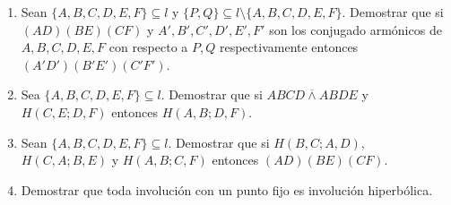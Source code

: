 \documentclass[12pt]{report}
\numberwithin{section}{chapter}
\begin{document}
\begin{enumerate}
\item Sean $\{A,B,C,D,E,F\}\subseteq l$ y $\{P,Q\}\subseteq l\setminus \{A,B,C,D,E,F\}$. Demostrar que si $(AD)(BE)(CF)$ y $A',B',C',D',E', F'$ son los conjugado armónicos de $A,B,C,D,E,F$ con respecto a $P, Q$  respectivamente entonces $(A'D')(B'E')(C'F')$.

\item Sea $\{A,B,C,D,E,F\}\subseteq l$. Demostrar que si $ABCD \overline{\wedge} ABDE$ y $H(C,E;D,F)$ entonces $H(A,B;D,F)$.

\item Sean $\{A,B,C,D,E,F\}\subseteq l$. Demostrar que si $H(B,C;A,D)$, $H(C,A;B,E)$ y $H(A,B;C,F)$ entonces $(AD)(BE)(CF)$.

\item Demostrar que toda involución con un punto fijo es involución hiperbólica.

\end{enumerate}
\end{document}
